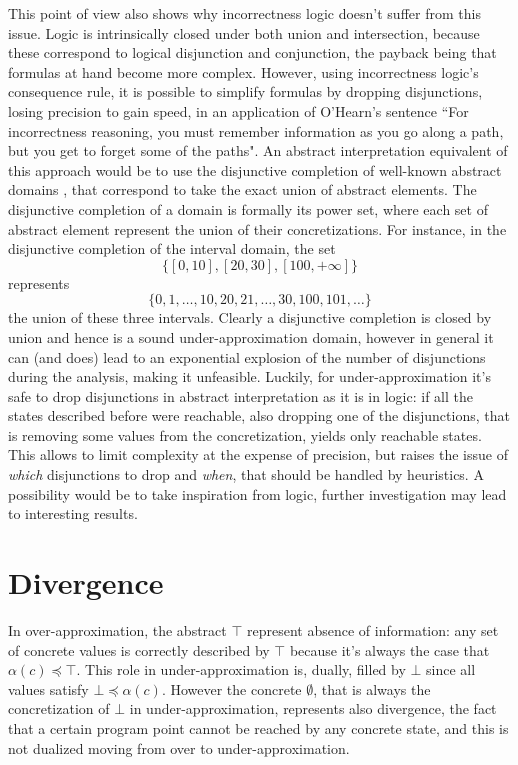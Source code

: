 This point of view also shows why incorrectness logic doesn't suffer from this issue. Logic is intrinsically closed under both union and intersection, because these correspond to logical disjunction and conjunction, the payback being that formulas at hand become more complex. However, using incorrectness logic's consequence rule, it is possible to simplify formulas by dropping disjunctions, losing precision to gain speed, in an application of O'Hearn's sentence \cite{ohearn-incorrectness-logic} ``For incorrectness reasoning, you must remember information as you go along a path, but you get to forget some of the paths".
An abstract interpretation equivalent of this approach would be to use the disjunctive completion of well-known abstract domains \cite{under-approx-disjunctive-completion}, that correspond to take the exact union of abstract elements. The disjunctive completion of a domain is formally its power set, where each set of abstract element represent the union of their concretizations. For instance, in the disjunctive completion of the interval domain, the set
\[
\{ [0, 10], [20, 30], [100, +\infty] \}
\]
represents
\[
\{ 0, 1, \dots, 10, 20, 21, \dots, 30, 100, 101, \dots \}
\]
the union of these three intervals. Clearly a disjunctive completion is closed by union and hence is a sound under-approximation domain, however in general it can (and does) lead to an exponential explosion of the number of disjunctions during the analysis, making it unfeasible. Luckily, for under-approximation it's safe to drop disjunctions in abstract interpretation as it is in logic: if all the states described before were reachable, also dropping one of the disjunctions, that is removing some values from the concretization, yields only reachable states. This allows to limit complexity at the expense of precision, but raises the issue of \textit{which} disjunctions to drop and \textit{when}, that should be handled by heuristics. A possibility would be to take inspiration from logic, further investigation may lead to interesting results.

\section{Divergence}
In over-approximation, the abstract $\top$ represent absence of information: any set of concrete values is correctly described by $\top$ because it's always the case that $\alpha(c) \preceq \top$. This role in under-approximation is, dually, filled by $\bot$ since all values satisfy $\bot \preceq \alpha(c)$.
However the concrete $\emptyset$, that is always the concretization of $\bot$ in under-approximation, represents also divergence, the fact that a certain program point cannot be reached by any concrete state, and this is not dualized moving from over to under-approximation.

